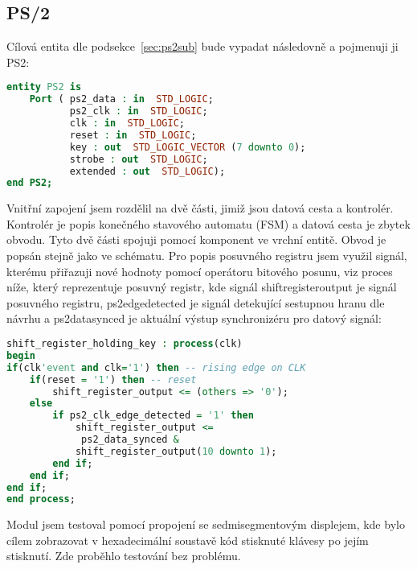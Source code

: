 \documentclass{report}
\begin{document}
\subsection{PS/2}\label{sec:ps2implement}
Cílová entita dle podsekce~\ref{sec:ps2sub} bude vypadat následovně a pojmenuji ji PS2:
\begin{lstlisting}[language=VHDL]
entity PS2 is
    Port ( ps2_data : in  STD_LOGIC;
           ps2_clk : in  STD_LOGIC;
           clk : in  STD_LOGIC;
           reset : in  STD_LOGIC;
           key : out  STD_LOGIC_VECTOR (7 downto 0);
           strobe : out  STD_LOGIC;
           extended : out  STD_LOGIC);
end PS2;
\end{lstlisting}
Vnitřní zapojení jsem rozdělil na dvě části, jimiž jsou datová cesta a kontrolér. Kontrolér je popis konečného stavového automatu (FSM) a datová cesta je zbytek obvodu. Tyto dvě části spojuji pomocí komponent ve vrchní entitě. Obvod je popsán stejně jako ve schématu. Pro popis posuvného registru jsem využil signál, kterému přiřazuji nové hodnoty pomocí operátoru bitového posunu, viz proces níže, který reprezentuje posuvný registr, kde signál shift\textunderscore register\textunderscore output je signál posuvného registru, ps2\textunderscore edge\textunderscore detected je signál detekující sestupnou hranu dle návrhu a ps2\textunderscore data\textunderscore synced je aktuální výstup synchronizéru pro datový signál: 
\begin{lstlisting}[language=VHDL]
shift_register_holding_key : process(clk)
begin
if(clk'event and clk='1') then -- rising edge on CLK          
	if(reset = '1') then -- reset
		shift_register_output <= (others => '0');
	else 
		if ps2_clk_edge_detected = '1' then
			shift_register_output <=
			 ps2_data_synced & 
			shift_register_output(10 downto 1);
		end if;
	end if;
end if;
end process;
\end{lstlisting}
Modul jsem testoval pomocí propojení se sedmisegmentovým displejem, kde bylo cílem zobrazovat v hexadecimální soustavě kód stisknuté klávesy po jejím stisknutí. Zde proběhlo testování bez problému.
\end{document}
